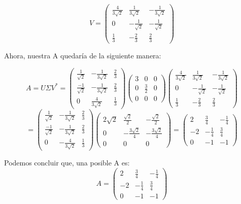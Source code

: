 $$
V = \begin{pmatrix}
\frac{4}{3 \sqrt{2}} & \frac{1}{3 \sqrt{2}} & -\frac{1}{3 \sqrt{2}} \\
0 & -\frac{1}{\sqrt{2}} & -\frac{1}{\sqrt{2}} \\
\frac{1}{3} & - \frac{2}{3} & \frac{2}{3}
\end{pmatrix}
$$

Ahora, nuestra A quedaría de la siguiente manera:

$$
A = U \Sigma V^*
    = \begin{pmatrix}
        \frac{1}{\sqrt{2}} & -\frac{1}{3 \sqrt{2}} & \frac{2}{3} \\
        \frac{-1}{\sqrt{2}} & -\frac{1}{3 \sqrt{2}} & \frac{2}{3} \\
        0 & \frac{4}{3 \sqrt{2}} & \frac{1}{3}
    \end{pmatrix}
    \begin{pmatrix}
        3 & 0 & 0 \\
        0 & \frac{3}{2} & 0  \\
        0 & 0 & 0
    \end{pmatrix}
    \begin{pmatrix}
        \frac{4}{3 \sqrt{2}} & \frac{1}{3 \sqrt{2}} & -\frac{1}{3 \sqrt{2}} \\
        0 & -\frac{1}{\sqrt{2}} & -\frac{1}{\sqrt{2}} \\
        \frac{1}{3} & - \frac{2}{3} & \frac{2}{3}
    \end{pmatrix}
$$
$$
    = \begin{pmatrix}
            \frac{1}{\sqrt{2}} & -\frac{1}{3 \sqrt{2}} & \frac{2}{3} \\
            \frac{-1}{\sqrt{2}} & -\frac{1}{3 \sqrt{2}} & \frac{2}{3} \\
            0 & -\frac{4}{3 \sqrt{2}} & \frac{1}{3}

            \end{pmatrix}
            \begin{pmatrix}
            2 \sqrt{2} & \frac{\sqrt{2}}{2} & -\frac{\sqrt{2}}{2} \\
            0 & -\frac{3 \sqrt{2}}{4} & - \frac{3 \sqrt{2}}{4}\\
            0 & 0 & 0
            \end{pmatrix}
    = \begin{pmatrix}
                2 & \frac{3}{4} & -\frac{1}{4} \\
                -2 & - \frac{1}{4} & \frac{3}{4}  \\
                0 & -1 & -1
        \end{pmatrix}
$$

Podemos concluir que, una posible A es:
$$
A = \begin{pmatrix}
                2 & \frac{3}{4} & -\frac{1}{4} \\
                -2 & - \frac{1}{4} & \frac{3}{4}  \\
                0 & -1 & -1
        \end{pmatrix}
$$

\begin{aportes}
  \item {}
\end{aportes}
